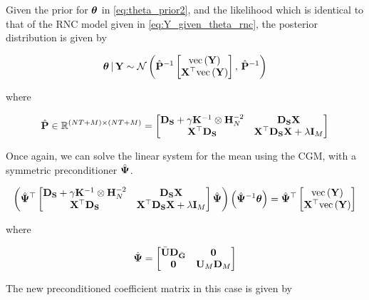 Given the prior for $\boldsymbol{\theta}$ in \cref{eq:theta_prior2}, and the likelihood which is identical to that of the RNC model given in \cref{eq:Y_given_theta_rnc}, the posterior distribution is given by 

\begin{equation}
    \boldsymbol{\theta} \, | \, \mathbf{Y} \sim \mathcal{N}\left(\hat{\mathbf{P}}^{-1} \begin{bmatrix} \text{\textup{vec}}\left(\mathbf{Y}\right) \\ \mathbf{X}^\top \text{\textup{vec}}\left(\mathbf{Y}\right) \end{bmatrix}, \, \hat{\mathbf{P}}^{-1}\right)
\end{equation}

where 

\begin{equation}
    \hat{\mathbf{P}} \in \mathbb{R}^{(NT + M) \times (NT + M)}= 
    \begin{bmatrix}
     \mathbf{D}_{\mathbf{S}} + \gamma \mathbf{K}^{-1} \otimes \mathbf{H}_N^{-2} & \mathbf{D}_{\mathbf{S}}  \mathbf{X} \\
     \mathbf{X}^\top \mathbf{D}_{\mathbf{S}} & \mathbf{X}^\top \mathbf{D}_{\mathbf{S}} \mathbf{X} + \lambda \mathbf{I}_M   
    \end{bmatrix}
\end{equation}

Once again, we can solve the linear system for the mean using the CGM, with a symmetric preconditioner $\hat{\mathbf{\Psi}}$.  

\begin{equation}
    \left( \hat{\mathbf{\Psi}}^\top \begin{bmatrix}
        \mathbf{D}_{\mathbf{S}} + \gamma \mathbf{K}^{-1} \otimes \mathbf{H}_N^{-2} & \mathbf{D}_{\mathbf{S}}  \mathbf{X} \\
        \mathbf{X}^\top \mathbf{D}_{\mathbf{S}} & \mathbf{X}^\top \mathbf{D}_{\mathbf{S}} \mathbf{X} + \lambda \mathbf{I}_M   
       \end{bmatrix}  \hat{\mathbf{\Psi}} \right) \left( \hat{\mathbf{\Psi}}^{-1} \boldsymbol{\theta} \right)   = \hat{\mathbf{\Psi}}^\top \begin{bmatrix} \text{\textup{vec}}\left(\mathbf{Y}\right) \\ \mathbf{X}^\top \text{\textup{vec}}\left(\mathbf{Y}\right) \end{bmatrix}
\end{equation}

where 

\begin{equation}
    \hat{\mathbf{\Psi}} =  \begin{bmatrix}
        \bar{\mathbf{U}} \mathbf{D}_{\bar{\mathbf{G}}} & \mathbf{0} \\
        \mathbf{0} & \mathbf{U}_M \mathbf{D}_M 
    \end{bmatrix}
\end{equation}

The new preconditioned coefficient matrix in this case is given by 

